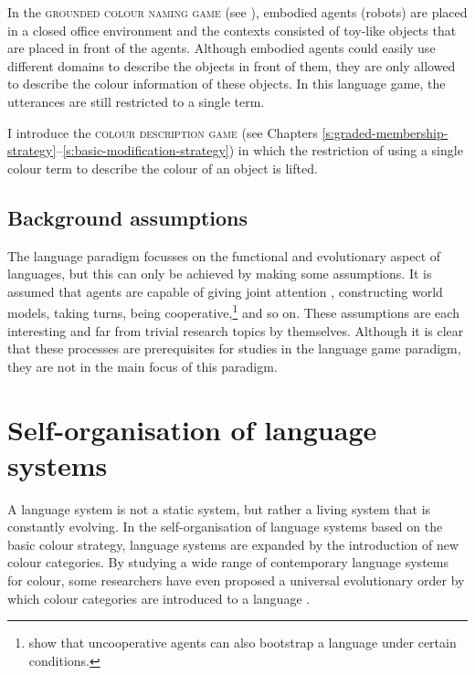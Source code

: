 \newpage
In the \textsc{grounded colour naming game} (see ),
embodied agents (ro\-bots) are placed in a closed office environment and
the contexts consisted of toy-like objects that are placed in front of
the agents. Although embodied agents could easily use different
domains to describe the objects in front of them, they are only
allowed to describe the colour information of these objects. In this
language game, the utterances are still restricted to a single term.

I introduce the \textsc{colour description game} (see Chapters
\ref{s:graded-membership-strategy}--\ref{s:basic-modification-strategy})
in which the restriction of using a single colour term to describe the
colour of an object is lifted.

\subsection{Background assumptions}

The language paradigm focusses on the functional and evolutionary
aspect of languages, but this can only be achieved by making some
assumptions. It is assumed that agents are capable of giving joint
attention \citep{tomasello95jointattention}, constructing world
models, taking turns, being cooperative,\footnote{\cite{wang08self}
  show that uncooperative agents can also bootstrap a language under
  certain conditions.} and so on. These assumptions are each
interesting and far from trivial research topics by
themselves. Although it is clear that these processes are
prerequisites for studies in the language game paradigm, they are not
in the main focus of this paradigm.

\section{Self-organisation of language systems}

A language system is not a static system, but rather a living system
that is constantly evolving. In the self-organisation of language systems
based on the basic colour strategy, language systems are expanded by
the introduction of new colour categories. By studying a wide range of
contemporary language systems for colour, some researchers have even
proposed a universal evolutionary order by which colour categories are
introduced to a language \citep{berlin69basic}.

